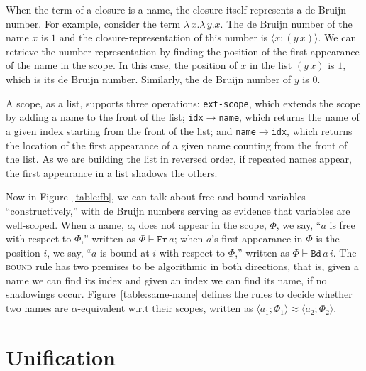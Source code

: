 \documentclass[a4paper,UKenglish]{lipics-v2016}
\newcommand{\clos}[2] {
  \langle #1; #2 \rangle
}
\newcommand{\aeq}[4] {
  \clos{#1}{#2} \approx \clos{#3}{#4}
}
\newcommand*{\transname}[1]{\textsc{#1}}
\begin{document}
When the term of a closure is a name, the closure itself represents a
de Bruijn number.  For example, consider the term
$\lambda\,x.\lambda\,y.x$. The de Bruijn number of the name $x$ is $1$
and the closure-representation of this number is $\clos{x}{(y\,x)}$.
We can retrieve the number-representation by finding the position of
the first appearance of the name in the scope. In this case, the
position of $x$ in the list $(y\,x)$ is $1$, which is its de Bruijn
number. Similarly, the de Bruijn number of $y$ is $0$.

A scope, as a list, supports three operations: \texttt{ext-scope},
which extends the scope by adding a name to the front of the list;
\texttt{idx$\rightarrow$name}, which returns the name of a given index
starting from the front of the list; and
\texttt{name$\rightarrow$idx}, which returns the location of the first
appearance of a given name counting from the front of the list.  As we
are building the list in reversed order, if repeated names appear, the
first appearance in a list shadows the others.

Now in Figure~\ref{table:fb}, we can talk about free and bound
variables ``constructively,'' with de Bruijn numbers serving as
evidence that variables are well-scoped.  When a name, $a$, does not
appear in the scope, $\Phi$, we say, ``$a$ is free with respect to
$\Phi$,'' written as $\Phi \vdash \texttt{Fr}\, a$; when $a$'s first
appearance in $\Phi$ is the position $i$, we say, ``$a$ is bound at
$i$ with respect to $\Phi$,'' written as $\Phi \vdash \texttt{Bd}\,
a\,i$.  The \transname{bound} rule has two premises to be algorithmic
in both directions, that is, given a name we can find its index and
given an index we can find its name, if no shadowings occur.
Figure~\ref{table:same-name} defines the rules to decide whether two
names are $\alpha$-equivalent w.r.t their scopes, written as
$\aeq{a_1}{\Phi_1}{a_2}{\Phi_2}$.

\pagebreak

\section{Unification}
\end{document}
